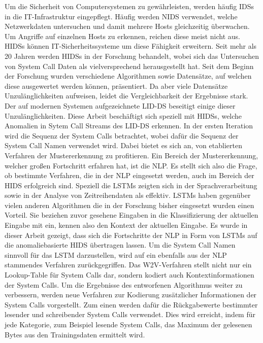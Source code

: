 Um die Sicherheit von Computersystemen zu gewährleisten, werden häufig \acp{IDS} in die IT-Infrastruktur eingepflegt.
Häufig werden \ac{NIDS} verwendet, welche Netzwerkdaten untersuchen und damit mehrere Hosts gleichzeitig überwachen.
Um Angriffe auf einzelnen Hosts zu erkennen, reichen diese meist nicht aus.
\acp{HIDS} können IT-Sicherheitssysteme um diese Fähigkeit erweitern.
Seit mehr als 20 Jahren werden \acp{HIDS} in der Forschung behandelt, wobei sich das Untersuchen von System Call Daten als vielversprechend herausgestellt hat.
Seit dem Beginn der Forschung wurden verschiedene Algorithmen sowie Datensätze, auf welchen diese ausgewertet werden können, präsentiert.
Da aber viele Datensätze Unzulänglichkeiten aufweisen, leidet die Vergleichbarkeit der Ergebnisse stark.
Der auf modernen Systemen aufgezeichnete \ac{LID-DS} beseitigt einige dieser Unzulänglichkeiten.
Diese Arbeit beschäftigt sich speziell mit \acp{HIDS}, welche Anomalien in Sytem Call Streams des \ac{LID-DS} erkennen. 
In der  ersten Iteration wird die Sequenz der System Calls betrachtet, wobei dafür die Sequenz der System Call Namen verwendet wird.
Dabei bietet es sich an, von etablierten Verfahren der Mustererkennung zu profitieren.
Ein Bereich der Mustererkennung, welcher großen Fortschritt erfahren hat, ist die \ac{NLP}.
Es stellt sich also die Frage, ob bestimmte Verfahren, die in der \ac{NLP} eingesetzt werden, auch im Bereich der \ac{HIDS} erfolgreich sind.
Speziell die \acp{LSTM} zeigten sich in der Sprachverarbeitung sowie in der Analyse von Zeitreihendaten als effektiv.
\acp{LSTM} haben gegenüber vielen anderen Algorithmen die in der Forschung bisher eingesetzt wurden einen Vorteil.
Sie beziehen zuvor gesehene Eingaben in die Klassifizierung der aktuellen Eingabe mit ein, kennen also den Kontext der aktuellen Eingabe.
Es wurde in dieser Arbeit gezeigt, dass sich die Fortschritte der \ac{NLP} in Form von \acp{LSTM} auf die anomaliebasierte \ac{HIDS} übertragen lassen.
Um die System Call Namen sinnvoll für das \ac{LSTM} darzustellen, wird auf ein ebenfalls aus der \ac{NLP} stammendes Verfahren zurückgegriffen.
Das \ac{W2V}-Verfahren stellt nicht nur ein Lookup-Table für System Calls dar, sondern kodiert auch Kontextinformationen der System Calls.
Um die Ergebnisse des entworfenen Algorithmus weiter zu verbessern, werden neue Verfahren zur Kodierung zusätzlicher Informationen der System Calls vorgestellt.
Zum einen werden dafür die Rückgabewerte bestimmter lesender und schreibender System Calls verwendet. 
Dies wird erreicht, indem für jede Kategorie, zum Beispiel lesende System Calls, das Maximum der gelesenen Bytes aus den Trainingsdaten ermittelt wird.
